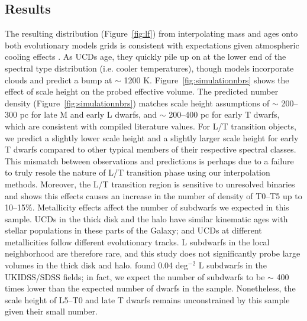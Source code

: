 \documentclass[manuscript]{aastex63}
\begin{document}
\subsection{Results}
The resulting \teff distribution (Figure~\ref{fig:lf}) from interpolating mass and ages onto both evolutionary models grids is consistent with expectations given atmospheric cooling effects \citep{2004ApJS..155..191B}. As UCDs age, they quickly pile up on at the lower end of the spectral type distribution (i.e. cooler temperatures), though \cite{2008ApJ...689.1327S} models incorporate clouds and predict a bump at \teff $\sim$ 1200 K. Figure~\ref{fig:simulationnbrs} shows the effect of scale height on the probed effective volume. The predicted number density (Figure~\ref{fig:simulationnbrs}) matches scale height assumptions of $\sim$ 200--300 pc for late M and early L dwarfs, and $\sim$ 200--400 pc for early T dwarfs, which are consistent with compiled literature values. For L/T transition objects, we predict a slightly lower scale height and a slightly larger scale height for early T dwarfs compared to other typical members of their respective spectral classes. This mismatch between observations and predictions is perhaps due to a failure to truly resole the nature of L/T transition phase using our interpolation methods. Moreover, the L/T transition region is sensitive to unresolved binaries \citep{2014ApJ...794..143B} and \cite{2007ApJ...659..655B} shows this effects causes an increase in the number of density of T0--T5 up to 10--15\%. Metallicity effects affect the number of subdwarfs we expected in this sample. UCDs in the thick disk and the halo have similar kinematic ages with stellar populations in these parts of the Galaxy; and UCDs at different metallicities follow different evolutionary tracks. L subdwarfs in the local neighborhood are therefore rare, and this study does not significantly probe large volumes in the thick disk and halo. \cite{Lodieu2017} found 0.04 deg$^{-2}$ L subdwarfs in the UKIDSS/SDSS fields; in fact, we expect the number of subdwarfs to be $\sim$ 400 times lower than the expected number of dwarfs in the sample. Nonetheless, the scale height of L5--T0 and late T dwarfs remains unconstrained by this sample given their small number. 
\end{document}
